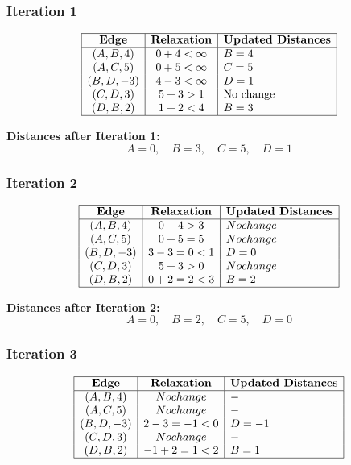 \documentclass[14pt,a4paper]{extarticle}
\begin{document}
\subsubsection*{Iteration 1}

\[
\begin{array}{|c|c|l|}
\hline
\textbf{Edge} & \textbf{Relaxation} & \textbf{Updated Distances} \\
\hline
(A, B, 4) & 0 + 4 < \infty & B = 4 \\
(A, C, 5) & 0 + 5 < \infty & C = 5 \\
(B, D, -3) & 4 - 3 < \infty & D = 1 \\
(C, D, 3) & 5 + 3 > 1 & $No change$ \\
(D, B, 2) & 1 + 2 < 4 & B = 3 \\
\hline
\end{array}
\]

\textbf{Distances after Iteration 1:}
\[
A = 0,\quad B = 3,\quad C = 5,\quad D = 1
\]

\subsubsection*{Iteration 2}

\[
\begin{array}{|c|c|l|}
\hline
\textbf{Edge} & \textbf{Relaxation} & \textbf{Updated Distances} \\
\hline
(A, B, 4) & 0 + 4 > 3 & No change \\
(A, C, 5) & 0 + 5 = 5 & No change \\
(B, D, -3) & 3 - 3 = 0 < 1 & D = 0 \\
(C, D, 3) & 5 + 3 > 0 & No change \\
(D, B, 2) & 0 + 2 = 2 < 3 & B = 2 \\
\hline
\end{array}
\]

\textbf{Distances after Iteration 2:}
\[
A = 0,\quad B = 2,\quad C = 5,\quad D = 0
\]

\subsubsection*{Iteration 3}

\[
\begin{array}{|c|c|l|}
\hline
\textbf{Edge} & \textbf{Relaxation} & \textbf{Updated Distances} \\
\hline
(A, B, 4) & No change & - \\
(A, C, 5) & No change & - \\
(B, D, -3) & 2 - 3 = -1 < 0 & D = -1 \\
(C, D, 3) & No change & - \\
(D, B, 2) & -1 + 2 = 1 < 2 & B = 1 \\
\hline
\end{array}
\]
\end{document}
